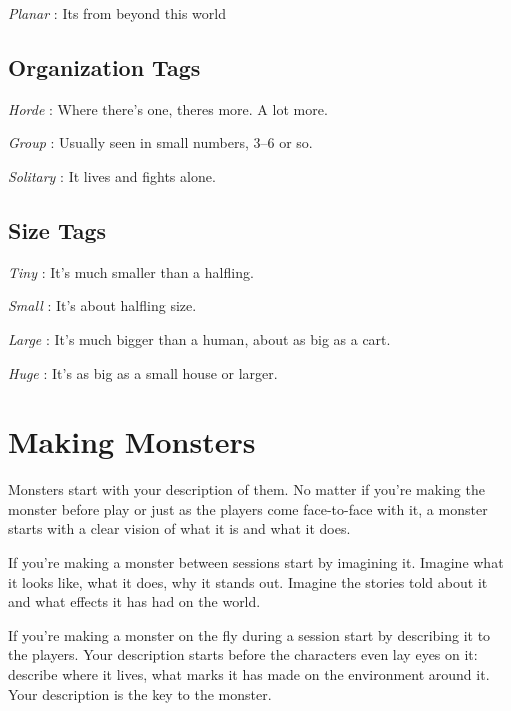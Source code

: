  

{\em Planar} : Its from beyond this world

 
\subsection{Organization Tags}    
 

{\em Horde} : Where there's one, theres more. A lot more.

 

{\em Group} : Usually seen in small numbers, 3–6 or so.

 

{\em Solitary} : It lives and fights alone.

 
\subsection{Size Tags}    
 

{\em Tiny} : It's much smaller than a halfling.

 

{\em Small} : It's about halfling size.

 

{\em Large} : It's much bigger than a human, about as big as a cart.

 

{\em Huge} : It's as big as a small house or larger.

 
\section{Making Monsters}   
 

Monsters start with your description of them. No matter if you're making the monster before play or just as the players come face-to-face with it, a monster starts with a clear vision of what it is and what it does.

 

If you're making a monster between sessions start by imagining it. Imagine what it looks like, what it does, why it stands out. Imagine the stories told about it and what effects it has had on the world.

 

If you're making a monster on the fly during a session start by describing it to the players. Your description starts before the characters even lay eyes on it: describe where it lives, what marks it has made on the environment around it. Your description is the key to the monster.

